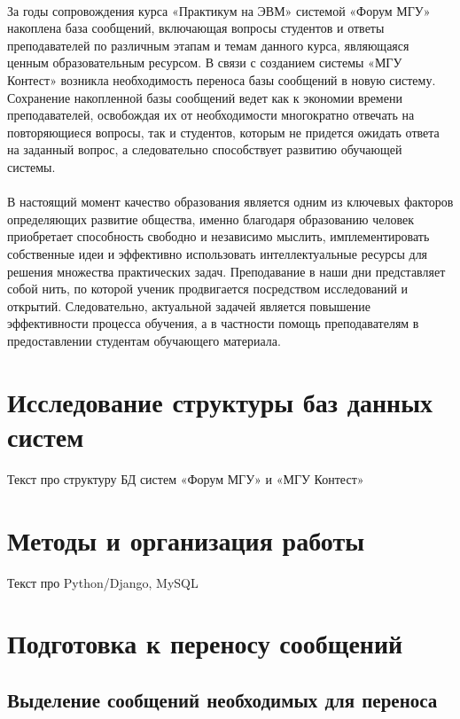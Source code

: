 \documentclass[12pt, a4paper, oneside]{article}
\begin{document}
\paragraph{} %
За годы сопровождения курса «Практикум на ЭВМ» системой «Форум МГУ» накоплена база сообщений, включающая вопросы студентов и ответы преподавателей по различным этапам и темам данного курса, являющаяся ценным образовательным ресурсом. В связи с созданием системы «МГУ Контест» возникла необходимость переноса базы сообщений в новую систему. Сохранение накопленной базы сообщений ведет как к экономии времени преподавателей, освобождая их от необходимости многократно отвечать на повторяющиеся вопросы, так и студентов, которым не придется ожидать ответа на заданный вопрос, а следовательно способствует развитию обучающей системы.
\paragraph{} %
В настоящий момент качество образования является одним из ключевых факторов определяющих развитие общества, именно благодаря образованию человек приобретает способность свободно и независимо мыслить, имплементировать собственные идеи и эффективно использовать интеллектуальные ресурсы для решения множества практических задач. Преподавание в наши дни представляет собой нить, по которой ученик продвигается посредством исследований и открытий. Следовательно, актуальной задачей является повышение эффективности процесса обучения, а в частности помощь преподавателям в предоставлении студентам обучающего материала.
\newpage

\section{Исследование структуры баз данных систем}
Текст про структуру БД систем «Форум МГУ» и «МГУ Контест»
\newpage

\section{Методы и организация работы}
Текст про Python/Django, MySQL
\newpage

\section{Подготовка к переносу сообщений}
\subsection{Выделение сообщений необходимых для переноса}
\end{document}
